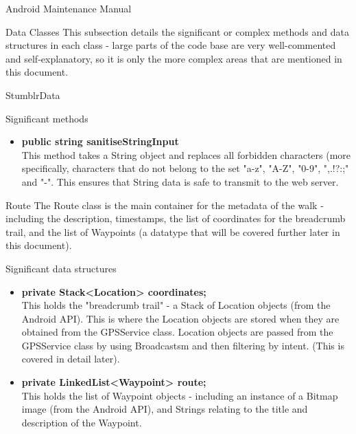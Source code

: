 \documentclass{article}
\begin{document}
\begin{section}{Android Maintenance Manual}
	\newpage
	\begin{subsection}{Data Classes}
		This subsection details the significant or complex methods and data structures in each class - large parts of the code base are very well-commented and self-explanatory, so it is only the more complex areas that are mentioned in this document.
		\begin{subsubsection}{StumblrData}
			\begin{paragraph}{Significant methods}
				\begin{itemize}				
					\item{{\bf public string sanitiseStringInput} \\
					This method takes a String object and replaces all forbidden characters (more specifically, characters that do not belong to the set "a-z", "A-Z", "0-9", ",.!?:;" and "-". This ensures that String data is safe to transmit to the web server.}
				\end{itemize}
			\end{paragraph}
		\end{subsubsection}
	
		\begin{subsubsection}{Route}
			The Route class is the main container for the metadata of the walk - including the description, timestamps, the list of coordinates for the breadcrumb trail, and the list of Waypoints (a datatype that will be covered further later in this document). \\
			
			\begin{paragraph}{Significant data structures}
				\begin{itemize}				
					\item{{\bf private Stack<Location> coordinates;} \\
					This holds the "breadcrumb trail" - a Stack of Location objects (from the Android API). This is where the Location objects are stored when they are obtained from the GPSService class. Location objects are passed from the GPSService class by using Broadcastsm and then filtering by intent. (This is covered in detail later).}
					\item{{\bf private LinkedList<Waypoint> route;} \\
					This holds the list of Waypoint objects - including an instance of a Bitmap image (from the Android API), and Strings relating to the title and description of the Waypoint.}
				\end{itemize}
			\end{paragraph}
			

\end{subsubsection}
\end{subsection}
\end{section}
\end{document}
